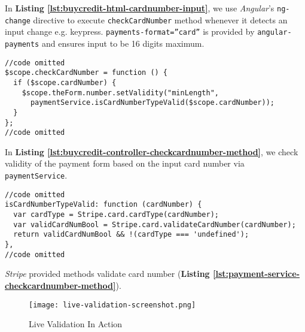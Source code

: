 In \textbf{Listing \ref{lst:buycredit-html-cardnumber-input}}, we  use \textit{Angular}’s \texttt{ng-change} directive to execute \texttt{checkCardNumber} method whenever it detects an input change e.g. keypress. \texttt{payments-format=”card”} is provided by \texttt{angular-payments} and ensures input to be 16 digits maximum.\\

\begin{listing}[H]
\begin{verbatim}
//code omitted
$scope.checkCardNumber = function () {
  if ($scope.cardNumber) {
    $scope.theForm.number.setValidity("minLength",
      paymentService.isCardNumberTypeValid($scope.cardNumber));
  }
};
//code omitted
\end{verbatim}
\label{lst:buycredit-controller-checkcardnumber-method}
\end{listing}

In \textbf{Listing \ref{lst:buycredit-controller-checkcardnumber-method}}, we check validity of the payment form based on the input card number via \texttt{paymentService}.\\

\begin{listing}[H]
\begin{verbatim}
//code omitted
isCardNumberTypeValid: function (cardNumber) {
  var cardType = Stripe.card.cardType(cardNumber);
  var validCardNumBool = Stripe.card.validateCardNumber(cardNumber);
  return validCardNumBool && !(cardType === 'undefined');
},
//code omitted
\end{verbatim}
\label{lst:payment-service-checkcardnumber-method}
\end{listing}

\textit{Stripe} provided methods validate card number (\textbf{Listing \ref{lst:payment-service-checkcardnumber-method}}).\\

\begin{figure}[!hbt]
  \centering
 	\texttt{[image: live-validation-screenshot.png]}
  \caption{Live Validation In Action}
 	\label{fig:live-validation-screenshot}
\end{figure}

